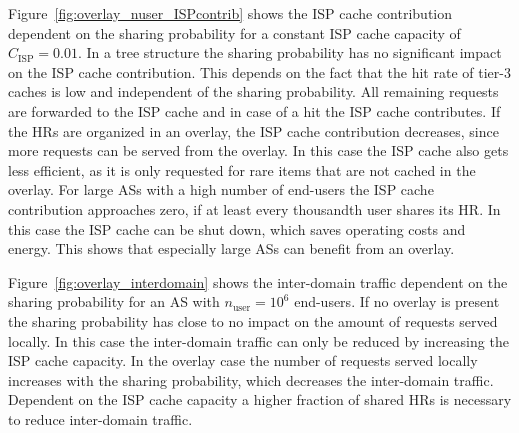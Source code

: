 

Figure~\ref{fig:overlay_nuser_ISPcontrib} shows the ISP cache contribution dependent on the sharing probability for a constant ISP cache capacity of $C_\text{ISP}=0.01$. In a tree structure the sharing probability has no significant impact on the ISP cache contribution. This depends on the fact that the hit rate of tier-3 caches is low and independent of the sharing probability. All remaining requests are forwarded to the ISP cache and in case of a hit the ISP cache contributes. If the HRs are organized in an overlay, the ISP cache contribution decreases, since more requests can be served from the overlay. In this case the ISP cache also gets less efficient, as it is only requested for rare items that are not cached in the overlay.
For large ASs with a high number of end-users the ISP cache contribution approaches zero, if at least every thousandth user shares its HR. In this case the ISP cache can be shut down, which saves operating costs and energy. This shows that especially large ASs can benefit from an overlay.


Figure~\ref{fig:overlay_interdomain} shows the inter-domain traffic dependent on the sharing probability for an AS with $n_\text{user}=10^6$ end-users. If no overlay is present the sharing probability has close to no impact on the amount of requests served locally. In this case the inter-domain traffic can only be reduced by increasing the ISP cache capacity. In the overlay case the number of requests served locally increases with the sharing probability, which decreases the inter-domain traffic. Dependent on the ISP cache capacity a higher fraction of shared HRs is necessary to reduce inter-domain traffic.

